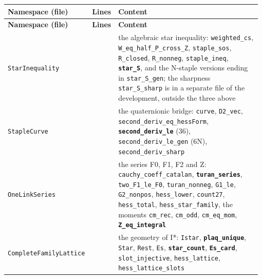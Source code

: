 \documentclass[11pt,a4paper]{article}
\theoremstyle{named}
\begin{document}
\begin{small}
\begin{longtable}{>{\raggedright\arraybackslash}p{0.331\linewidth}>{\raggedright\arraybackslash}p{0.05\linewidth}>{\raggedright\arraybackslash}p{0.596\linewidth}}
\hline
\textbf{Namespace (file)} & \textbf{Lines} & \textbf{Content} \\
\hline
\endfirsthead
\hline
\textbf{Namespace (file)} & \textbf{Lines} & \textbf{Content} \\
\hline
\endhead
\hline
\endfoot
\texttt{StarInequality} & 586 & the algebraic star inequality: \texttt{weighted\_\allowbreak{}cs}, \texttt{W\_\allowbreak{}eq\_\allowbreak{}half\_\allowbreak{}P\_\allowbreak{}cross\_\allowbreak{}Z}, \texttt{staple\_\allowbreak{}sos}, \texttt{R\_\allowbreak{}closed}, \texttt{R\_\allowbreak{}nonneg}, \texttt{staple\_\allowbreak{}ineq}, \textbf{\texttt{star\_\allowbreak{}S}}, and the N-staple versions ending in \texttt{star\_\allowbreak{}S\_\allowbreak{}gen}; the sharpness \texttt{star\_\allowbreak{}S\_\allowbreak{}sharp} is in a separate file of the development, outside the three above \\
\texttt{StapleCurve} & 394 & the quaternionic bridge: \texttt{curve}, \texttt{D2\_\allowbreak{}vec}, \texttt{second\_\allowbreak{}deriv\_\allowbreak{}eq\_\allowbreak{}hessForm}, \textbf{\texttt{second\_\allowbreak{}deriv\_\allowbreak{}le}} (36), \texttt{second\_\allowbreak{}deriv\_\allowbreak{}le\_\allowbreak{}gen} (6N), \texttt{second\_\allowbreak{}deriv\_\allowbreak{}sharp} \\
\texttt{OneLinkSeries} & 886 & the series F0, F1, F2 and Z: \texttt{cauchy\_\allowbreak{}coeff\_\allowbreak{}catalan}, \textbf{\texttt{turan\_\allowbreak{}series}}, \texttt{two\_\allowbreak{}F1\_\allowbreak{}le\_\allowbreak{}F0}, \texttt{turan\_\allowbreak{}nonneg}, \texttt{G1\_\allowbreak{}le}, \texttt{G2\_\allowbreak{}nonpos}, \texttt{hess\_\allowbreak{}lower}, \texttt{count27}, \texttt{hess\_\allowbreak{}total}, \texttt{hess\_\allowbreak{}star\_\allowbreak{}family}, the moments \texttt{cm\_\allowbreak{}rec}, \texttt{cm\_\allowbreak{}odd}, \texttt{cm\_\allowbreak{}eq\_\allowbreak{}mom}, \textbf{\texttt{Z\_\allowbreak{}eq\_\allowbreak{}integral}} \\
\texttt{CompleteFamilyLattice} & 609 & the geometry of I*: \texttt{Istar}, \textbf{\texttt{plaq\_\allowbreak{}unique}}, \texttt{Star}, \texttt{Rest}, \texttt{Es}, \textbf{\texttt{star\_\allowbreak{}count}}, \textbf{\texttt{Es\_\allowbreak{}card}}, \texttt{slot\_\allowbreak{}injective}, \texttt{hess\_\allowbreak{}lattice}, \texttt{hess\_\allowbreak{}lattice\_\allowbreak{}slots} \\

\end{longtable}
\end{small}
\end{document}

